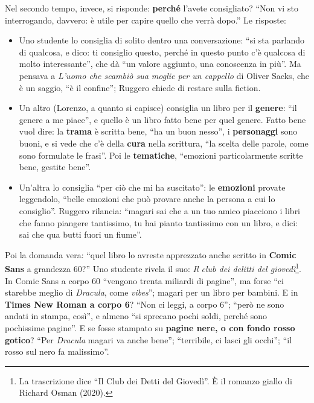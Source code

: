 Nel secondo tempo, invece, si risponde: \textbf{perché} l'avete consigliato? ``Non vi
sto interrogando, davvero: è utile per capire quello che verrà dopo.'' Le risposte:
\begin{itemize}
  \item Uno studente lo consiglia di solito dentro una conversazione: ``si sta parlando
        di qualcosa, e dico: ti consiglio questo, perché in questo punto c'è qualcosa di
        molto interessante'', che dà ``un valore aggiunto, una conoscenza in più''. Ma
        pensava a \emph{L'uomo che scambiò sua moglie per un cappello} di Oliver Sacks,
        che è un saggio, ``è il confine''; Ruggero chiede di restare sulla fiction.
  \item Un altro (Lorenzo, a quanto si capisce) consiglia un libro per il
        \textbf{genere}: ``il genere a me piace'', e quello è un libro fatto bene per
        quel genere. Fatto bene vuol dire: la \textbf{trama} è scritta bene, ``ha un
        buon nesso'', i \textbf{personaggi} sono buoni, e si vede che c'è della
        \textbf{cura} nella scrittura, ``la scelta delle parole, come sono formulate le
        frasi''. Poi le \textbf{tematiche}, ``emozioni particolarmente scritte bene,
        gestite bene''.
  \item Un'altra lo consiglia ``per ciò che mi ha suscitato'': le \textbf{emozioni}
        provate leggendolo, ``belle emozioni che può provare anche la persona a cui lo
        consiglio''. Ruggero rilancia: ``magari sai che a un tuo amico piacciono i libri
        che fanno piangere tantissimo, tu hai pianto tantissimo con un libro, e dici: sai
        che qua butti fuori un fiume''.
\end{itemize}

Poi la domanda vera: ``quel libro lo avreste apprezzato anche scritto in \textbf{Comic
Sans} a grandezza 60?'' Uno studente rivela il suo: \emph{Il club dei delitti del
giovedì}\footnote{La trascrizione dice ``Il Club dei Detti del Giovedì''. È il romanzo
giallo di Richard Osman (2020).}. In Comic Sans a corpo 60 ``vengono trenta miliardi di
pagine'', ma forse ``ci starebbe meglio di \emph{Dracula}, come \emph{vibes}''; magari
per un libro per bambini. E in \textbf{Times New Roman a corpo 6}? ``Non ci leggi, a
corpo 6''; ``però ne sono andati in stampa, così'', e almeno ``si sprecano pochi soldi,
perché sono pochissime pagine''. E se fosse stampato su \textbf{pagine nere, o con
fondo rosso gotico}? ``Per \emph{Dracula} magari va anche bene''; ``terribile, ci lasci
gli occhi''; ``il rosso sul nero fa malissimo''.

